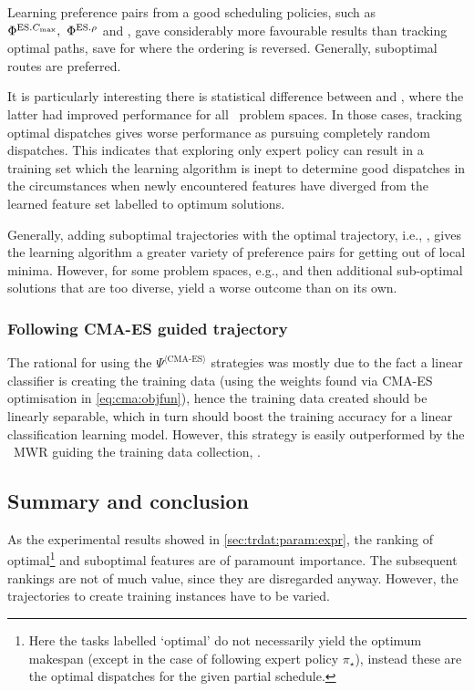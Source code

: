 

Learning preference pairs from a good scheduling policies, such as 
$\Phi^{\text{ES}.{C_{\max}}},~\Phi^{\text{ES}.{\rho}}$ and , gave considerably more 
favourable results than tracking optimal paths, save for  where the 
ordering is reversed. Generally, suboptimal routes are preferred. 

It is particularly interesting there is statistical difference between 
 and , where the latter had improved performance for 
all \JSP\ problem spaces. In those cases, tracking optimal dispatches gives 
worse performance as pursuing completely random dispatches. 
This indicates that exploring only expert policy can result in a 
training set which the learning algorithm is inept to determine good dispatches 
in the circumstances when newly encountered features have diverged from the 
learned feature set labelled to optimum solutions. 

Generally, adding suboptimal trajectories with the optimal trajectory, i.e., 
,  gives the learning algorithm a greater variety of preference 
pairs for getting out of local minima. However, for some problem spaces, e.g., 
 and  then additional sub-optimal solutions that are too 
diverse, yield a worse outcome than  on its own.

\subsubsection{Following CMA-ES guided trajectory}
The rational for using the $\Psi^{\langle \text{CMA-ES} \rangle}$ strategies 
was mostly due to the fact a linear classifier is creating the training data 
(using the weights found via CMA-ES optimisation in \cref{eq:cma:objfun}), 
hence the training data created should be linearly separable, which in turn 
should boost the training accuracy for a linear classification learning model. 
However, this strategy is easily outperformed by the \sdr\ MWR guiding the 
training data collection, . 

\subsection{Summary and conclusion}
As the experimental results showed in \cref{sec:trdat:param:expr}, the ranking 
of optimal\footnote{Here the tasks labelled `optimal' do not necessarily yield 
    the optimum makespan (except in the case of following expert policy 
    $\pi_\star$), instead these are the optimal dispatches for the given 
    partial schedule.} 
and suboptimal features are of paramount importance. The subsequent rankings 
are not of much value, since they are disregarded anyway. However, the 
trajectories to create training instances have to be varied.

